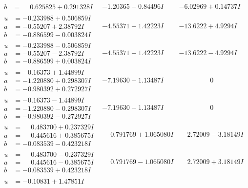 \documentclass[1p]{elsarticle_modified}
\theoremstyle{definition}
\begin{document}
$$\begin{array}{c|c|c}
\begin{aligned}
b &= \phantom{-}0.625825 + 0.291328 I\end{aligned}
 & -1.20365 - 0.84496 I & -6.02969 + 0.14737 I \\ \hline\begin{aligned}
u &= -0.233988 + 0.506859 I \\
a &= -0.55207 + 2.38792 I \\
b &= -0.886599 - 0.003824 I\end{aligned}
 & -4.55371 - 1.42223 I & -13.6222 + 4.9294 I \\ \hline\begin{aligned}
u &= -0.233988 - 0.506859 I \\
a &= -0.55207 - 2.38792 I \\
b &= -0.886599 + 0.003824 I\end{aligned}
 & -4.55371 + 1.42223 I & -13.6222 - 4.9294 I \\ \hline\begin{aligned}
u &= -0.16373 + 1.44899 I \\
a &= -1.220880 + 0.298307 I \\
b &= -0.980392 + 0.272927 I\end{aligned}
 & -7.19630 - 1.13487 I & \phantom{-0.000000 } 0 \\ \hline\begin{aligned}
u &= -0.16373 - 1.44899 I \\
a &= -1.220880 - 0.298307 I \\
b &= -0.980392 - 0.272927 I\end{aligned}
 & -7.19630 + 1.13487 I & \phantom{-0.000000 } 0 \\ \hline\begin{aligned}
u &= \phantom{-}0.483700 + 0.237329 I \\
a &= \phantom{-}0.445616 + 0.385675 I \\
b &= -0.083539 - 0.423218 I\end{aligned}
 & \phantom{-}0.791769 + 1.065080 I & \phantom{-}2.72009 - 3.18149 I \\ \hline\begin{aligned}
u &= \phantom{-}0.483700 - 0.237329 I \\
a &= \phantom{-}0.445616 - 0.385675 I \\
b &= -0.083539 + 0.423218 I\end{aligned}
 & \phantom{-}0.791769 - 1.065080 I & \phantom{-}2.72009 + 3.18149 I \\ \hline\begin{aligned}
u &= -0.10831 + 1.47851 I \\

\end{aligned}
\end{array}$$
\end{document}
